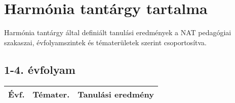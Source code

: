 
\section{Harmónia tantárgy tartalma }
Harmónia tantárgy által definiált tanulási eredmények a NAT pedagógiai szakaszai, évfolyamszintek és tématerületek szerint csoportosítva.

\subsection{1-4. évfolyam}
\begin{small}
  \begin{longtable}{c | p{2cm} |  p{11cm} }
    \textbf{Évf.} & \textbf{Témater.} & \textbf{Tanulási eredmény} \\ \hline \hline
    \endhead


\end{longtable}
\end{small}
